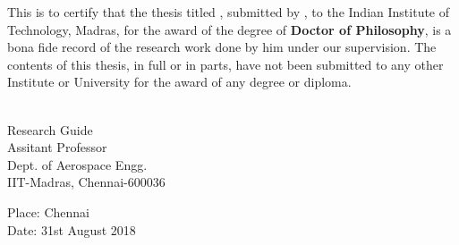 %
\certificate

\vspace*{0.5in}

\noindent This is to certify that the thesis titled {\bf \thesistitle}, submitted by {\bf \thesisauthor}, 
  to the Indian Institute of Technology, Madras, for
the award of the degree of {\bf Doctor of Philosophy}, is a bona fide
record of the research work done by him under our supervision.  The
contents of this thesis, in full or in parts, have not been submitted
to any other Institute or University for the award of any degree or
diploma.

\vspace*{1.5in}

\begin{singlespacing}
\hspace*{-0.25in}
\parbox{2.5in}{
 \\
\noindent Research Guide \\ 
\noindent Assitant Professor \\
\noindent Dept. of Aerospace Engg.\\
\noindent IIT-Madras, Chennai-600036 \\
}
\hspace*{1.0in} 
\end{singlespacing}
\vspace*{0.25in}
\parbox{2.5in}{
\noindent Place: Chennai\\
\noindent Date: 31st August 2018 
}
